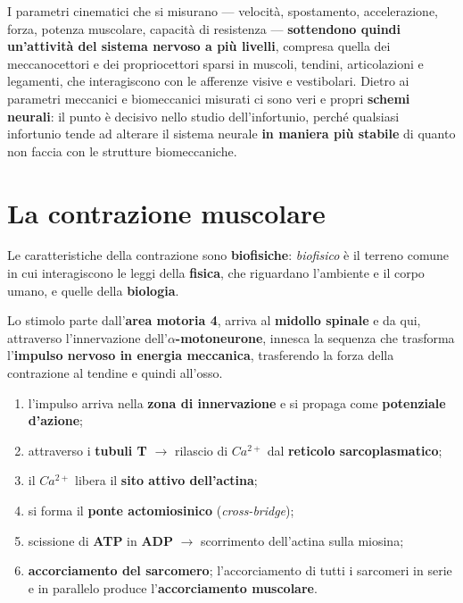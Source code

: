 I parametri cinematici che si misurano --- velocità, spostamento, accelerazione, forza, potenza
muscolare, capacità di resistenza --- \textbf{sottendono quindi un'attività del sistema nervoso
a più livelli}, compresa quella dei meccanocettori e dei propriocettori sparsi in muscoli,
tendini, articolazioni e legamenti, che interagiscono con le afferenze visive e vestibolari.
Dietro ai parametri meccanici e biomeccanici misurati ci sono veri e propri \textbf{schemi
neurali}: il punto è decisivo nello studio dell'infortunio, perché qualsiasi infortunio tende ad
alterare il sistema neurale \textbf{in maniera più stabile} di quanto non faccia con le strutture
biomeccaniche.

\section{La contrazione muscolare}

Le caratteristiche della contrazione sono \textbf{biofisiche}: \textit{biofisico} è il terreno
comune in cui interagiscono le leggi della \textbf{fisica}, che riguardano l'ambiente e il corpo
umano, e quelle della \textbf{biologia}.

Lo stimolo parte dall'\textbf{area motoria 4}, arriva al \textbf{midollo spinale} e da qui,
attraverso l'innervazione dell'\textbf{$\alpha$-motoneurone}, innesca la sequenza che trasforma
l'\textbf{impulso nervoso in energia meccanica}, trasferendo la forza della contrazione al
tendine e quindi all'osso.

\begin{enumerate}
  \item l'impulso arriva nella \textbf{zona di innervazione} e si propaga come \textbf{potenziale
    d'azione};
  \item attraverso i \textbf{tubuli T} $\rightarrow$ rilascio di $Ca^{2+}$ dal \textbf{reticolo
    sarcoplasmatico};
  \item il $Ca^{2+}$ libera il \textbf{sito attivo dell'actina};
  \item si forma il \textbf{ponte actomiosinico} (\textit{cross-bridge});
  \item scissione di \textbf{ATP} in \textbf{ADP} $\rightarrow$ scorrimento dell'actina sulla
    miosina;
  \item \textbf{accorciamento del sarcomero}; l'accorciamento di tutti i sarcomeri in serie e in
    parallelo produce l'\textbf{accorciamento muscolare}.
\end{enumerate}

